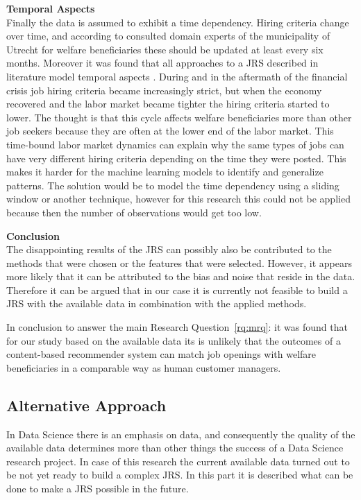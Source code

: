 \noindent
\textbf{Temporal Aspects} \\
Finally the data is assumed to exhibit a time dependency.
Hiring criteria change over time, and according to consulted domain experts of the municipality of Utrecht for welfare beneficiaries these should be updated at least every six months. 
Moreover it was found that all approaches to a JRS described in literature model temporal aspects  \cite{kenthapadi2017personalized, T.Al-Otaibi2012ASystems, Zheng2012JobSurvey, hong2013job}.
During and in the aftermath of the financial crisis job hiring criteria became increasingly strict, but when the economy recovered and the labor market became tighter the hiring criteria started to lower. 
The thought is that this cycle affects welfare beneficiaries more than other job seekers because they are often at the lower end of the labor market.
This time-bound labor market dynamics can explain why the same types of jobs can have very different hiring criteria depending on the time they were posted.
This makes it harder for the machine learning models to identify and generalize patterns.
The solution would be to model the time dependency using a sliding window or another technique, however for this research this could not be applied because then the number of observations would get too low.  

\noindent
\textbf{Conclusion}\\
The disappointing results of the JRS can possibly also be contributed to the methods that were chosen or the features that were selected. 
However, it appears more likely that it can be attributed to the bias and noise that reside in the data.
Therefore it can be argued that in our case it is currently not feasible to build a JRS with the available data in combination with the applied methods. 

In conclusion to answer the main Research Question~\ref{rq:mrq}: it was found that for our study based on the available data its is unlikely that the outcomes of a content-based recommender system can match job openings with welfare beneficiaries in a comparable way as human customer managers. 

\subsection{Alternative Approach}
\label{ssec:learnings}

In Data Science there is an emphasis on data, and consequently the quality of the available data determines more than other things the success of a Data Science research project.
In case of this research the current available data turned out to be not yet ready to build a complex JRS. 
In this part it is described what can be done to make a JRS possible in the future.

